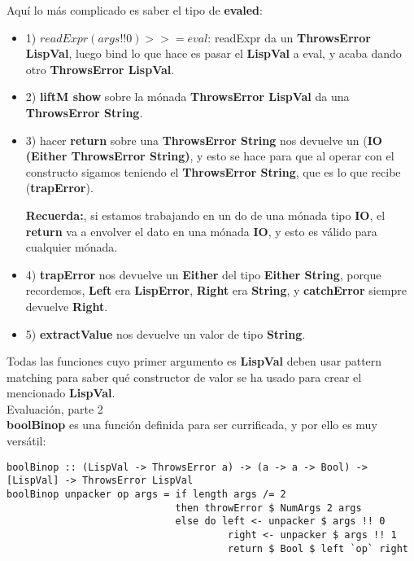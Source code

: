 Aqu\'i lo m\'as complicado es saber el tipo de \textbf{evaled}:

\begin{itemize}

\item 1) $readExpr (args !! 0) >>= eval$: readExpr da un \textbf{ThrowsError LispVal}, luego bind lo que hace es pasar el \textbf{LispVal} a eval, y acaba dando otro \textbf{ThrowsError LispVal}.

\item 2) \textbf{liftM show} sobre la m\'onada \textbf{ThrowsError LispVal} da una \textbf{ThrowsError String}.

\item 3) hacer \textbf{return} sobre una \textbf{ThrowsError String} nos devuelve un (\textbf{IO (Either ThrowsError String)}, y esto se hace para que al operar con el constructo \textbf{\<\-} sigamos teniendo el \textbf{ThrowsError String}, que es lo que recibe (\textbf{trapError}).

\textbf{Recuerda:}, si estamos trabajando en un do de una m\'onada tipo \textbf{IO}, el \textbf{return} va a envolver el dato en una m\'onada \textbf{IO}, y esto es v\'alido para cualquier m\'onada.

\item 4) \textbf{trapError} nos devuelve un \textbf{Either} del tipo \textbf{Either String}, porque recordemos, \textbf{Left} era \textbf{LispError}, \textbf{Right} era \textbf{String}, y \textbf{catchError} siempre devuelve \textbf{Right}.

\item 5) \textbf{extractValue} nos devuelve un valor de tipo \textbf{String}.
\end{itemize}

Todas las funciones cuyo primer argumento es \textbf{LispVal} deben usar pattern matching para saber qu\'e constructor de valor se ha usado para crear el mencionado \textbf{LispVal}.\\

Evaluaci\'on, parte 2\\

\textbf{boolBinop} es una funci\'on definida para ser currificada, y por ello es muy vers\'atil:\\

\begin{minipage}{\linewidth}
\begin{tiny}
\begin{lstlisting}[frame=single]
boolBinop :: (LispVal -> ThrowsError a) -> (a -> a -> Bool) -> [LispVal] -> ThrowsError LispVal
boolBinop unpacker op args = if length args /= 2 
                             then throwError $ NumArgs 2 args
                             else do left <- unpacker $ args !! 0
                                      right <- unpacker $ args !! 1
                                      return $ Bool $ left `op` right
\end{lstlisting}
\end{tiny}
\end{minipage}

